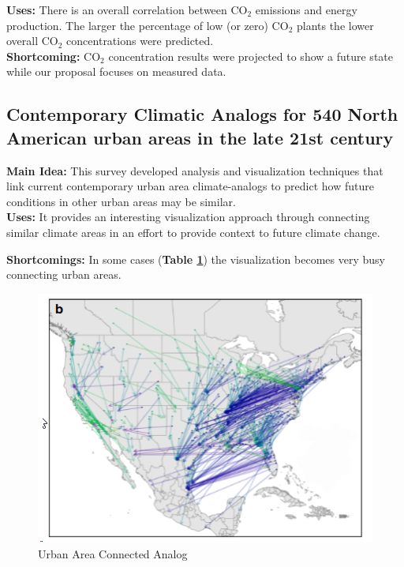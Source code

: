 \documentclass[sigconf,nonacm=true]{acmart}
\begin{document}
\textbf{Uses:} There is an overall correlation between CO$_2$ emissions and energy production.  The larger the percentage of low (or zero) CO$_2$ plants the lower overall CO$_2$ concentrations were predicted. \\

\textbf{Shortcoming:} CO$_2$ concentration results were projected to show a future state while our proposal focuses on measured data.\\

\subsection{Contemporary Climatic Analogs for 540 North American urban areas in the late 21st century \cite[Page Count:~7]{Comfort_4_FitzpatrickMatthew2019Ccaf}}
\textbf{Main Idea:} This survey developed analysis and visualization techniques that link current contemporary urban area climate-analogs to predict how future conditions in other urban areas may be similar.\\

\textbf{Uses:} It provides an interesting visualization approach through connecting similar climate areas in an effort to provide context to future climate change.  

\textbf{Shortcomings:} In some cases (\textbf{Table \ref{fig:connectedAnalog}}) the visualization becomes very busy connecting urban areas.\\
\begin{figure}[H]
	\centering
	\includegraphics[width=0.9\linewidth]{images/connectedAnalog}
	\caption{Urban Area Connected Analog \protect\cite{Comfort_4_FitzpatrickMatthew2019Ccaf}}
	\label{fig:connectedAnalog}
\end{figure}
\end{document}
